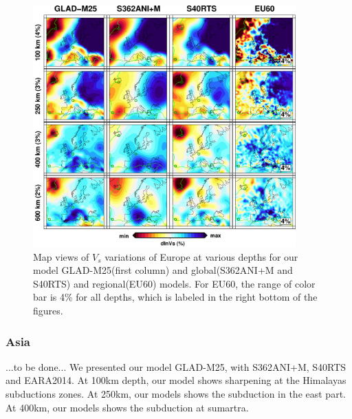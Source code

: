 \documentclass[extra,mreferee]{gji}
\begin{document}
\begin{figure}
\includegraphics[width=0.9\textwidth]{figures/depth_slice/europe_vs.pdf}
  \caption{Map views of $V_s$ variations of Europe at various depths for our
  model GLAD-M25(first column) and global(S362ANI+M and S40RTS) and
  regional(EU60\citep{zhu2015seismic}) models. For EU60, the range of color
  bar is 4\% for all depths, which is labeled in the right bottom of the figures.}
\label{fig:europe-vs}
\centering
\end{figure}

\subsubsection{Asia}

...to be done...
We presented our model GLAD-M25, with S362ANI+M, S40RTS and EARA2014.
At 100km depth, our model shows sharpening at the Himalayas subductions
zones. At 250km, our models shows the subduction in the east part.
At 400km, our models shows the subduction at sumartra.
\end{document}
